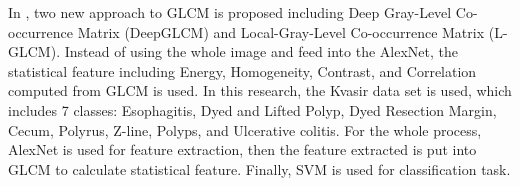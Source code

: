 \documentclass{article}
\begin{document}
	In \cite{103733}, two new approach to GLCM is proposed including Deep Gray-Level Co-occurrence Matrix (DeepGLCM) and Local-Gray-Level Co-occurrence Matrix (L-GLCM). Instead of using the whole image and feed into the AlexNet, the statistical feature including Energy, Homogeneity, Contrast, and Correlation computed from GLCM is used. In this research, the Kvasir data set is used, which includes 7 classes: Esophagitis, Dyed and Lifted Polyp, Dyed Resection Margin, Cecum, Polyrus, Z-line, Polyps, and Ulcerative colitis. For the whole process, AlexNet is used for
	feature extraction, then the feature extracted is put into GLCM to calculate statistical feature. Finally, SVM is used for classification task.
	
	 
	 
	
	\appendix
	
\end{document}
